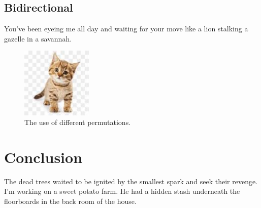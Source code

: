 \documentclass[dea,biber]{now-journal}
\begin{document}
    

    \subsection{Bidirectional}

        You've been eyeing me all day and waiting for your move like a lion stalking a gazelle in a savannah.

    
        \begin{figure}[t]
        \centering
        \includegraphics[width=0.3\textwidth]{images.jpeg}
        \caption{The use of different permutations.}
        \end{figure}


\section{Conclusion}

The dead trees waited to be ignited by the smallest spark and seek their revenge.
I’m working on a sweet potato farm.
He had a hidden stash underneath the floorboards in the back room of the house.

\printbibliography
\end{document}
